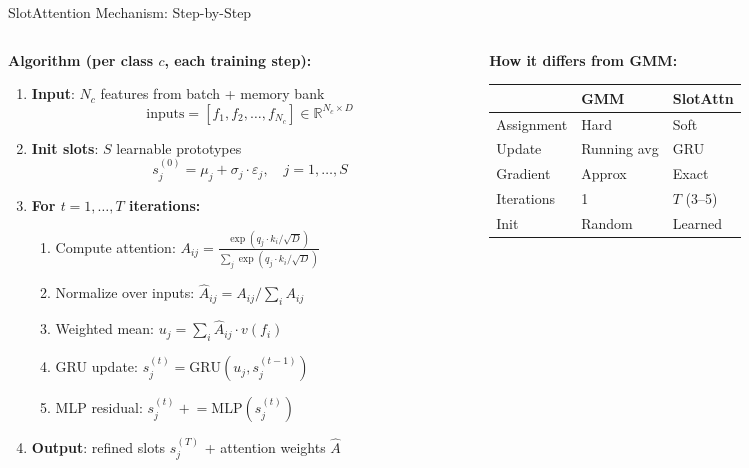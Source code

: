 \documentclass[aspectratio=169, 10pt]{beamer}
\newcommand{\good}[1]{\textcolor{goodgreen}{#1}}
\begin{document}
\begin{frame}{SlotAttention Mechanism: Step-by-Step}

\vspace{-0.1cm}
\begin{columns}[T]
\begin{column}{0.52\textwidth}
\textbf{Algorithm (per class $c$, each training step):}

\vspace{0.1cm}
\scriptsize
\begin{enumerate}\setlength{\itemsep}{2pt}
    \item \textbf{Input}: $N_c$ features from batch + memory bank
    \[ \text{inputs} = [f_1, f_2, \ldots, f_{N_c}] \in \mathbb{R}^{N_c \times D} \]
    \item \textbf{Init slots}: $S$ learnable prototypes
    \[ s_j^{(0)} = \mu_j + \sigma_j \cdot \varepsilon_j, \quad j=1,\ldots,S \]
    \item \textbf{For $t = 1, \ldots, T$ iterations:}
    \begin{enumerate}\scriptsize
        \item Compute attention: $A_{ij} = \frac{\exp(q_j \cdot k_i / \sqrt{D})}{\sum_j \exp(q_j \cdot k_i / \sqrt{D})}$
        \item Normalize over inputs: $\hat{A}_{ij} = A_{ij} / \sum_i A_{ij}$
        \item Weighted mean: $u_j = \sum_i \hat{A}_{ij} \cdot v(f_i)$
        \item GRU update: $s_j^{(t)} = \text{GRU}(u_j, s_j^{(t-1)})$
        \item MLP residual: $s_j^{(t)} \mathrel{+}= \text{MLP}(s_j^{(t)})$
    \end{enumerate}
    \item \textbf{Output}: refined slots $s_j^{(T)}$ + attention weights $\hat{A}$
\end{enumerate}
\end{column}
\begin{column}{0.45\textwidth}
\textbf{How it differs from GMM:}

\vspace{0.1cm}
\small
\begin{tabular}{p{1.8cm}p{1.5cm}p{1.5cm}}
\toprule
& \textbf{GMM} & \textbf{SlotAttn} \\
\midrule
Assignment & Hard & \good{Soft} \\
Update & Running avg & \good{GRU} \\
Gradient & Approx & \good{Exact} \\
Iterations & 1 & $T$ (3--5) \\
Init & Random & Learned \\
\bottomrule
\end{tabular}


\end{column}
\end{columns}
\end{frame}
\end{document}

